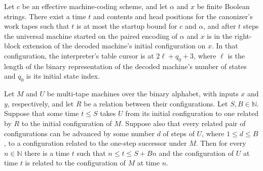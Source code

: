 \begin{lemma}
\label{Turing.universal_initialized}
\leanok
{}
Let $c$ be an effective machine-coding scheme, and let $\alpha$ and $x$ be finite
Boolean strings. There exist a time $t$ and contents and head positions for the
canonizer’s work tapes such that $t$ is at most the startup bound for $c$ and $\alpha$,
and after $t$ steps the universal machine started on the paired encoding of $\alpha$ and
$x$ is in the right-block extension of the decoded machine’s initial configuration on
$x$. In that configuration, the interpreter’s table cursor is at $2\ell+q_0+3$, where
$\ell$ is the length of the binary representation of the decoded machine’s number of
states and $q_0$ is its initial state index.
\end{lemma}

\begin{lemma}
\label{Turing.universal_block_run}
\leanok
{}
Let $M$ and $U$ be multi-tape machines over the binary alphabet, with inputs $x$ and
$y$, respectively, and let $R$ be a relation between their configurations. Let
$S,B\in\mathbb{N}$. Suppose that some time $t\le S$ takes $U$ from its initial
configuration to one related by $R$ to the initial configuration of $M$. Suppose also
that every related pair of configurations can be advanced by some number $d$ of steps of
$U$, where $1\le d\le B$, to a configuration related to the one-step successor under
$M$. Then for every $n\in\mathbb{N}$ there is a time $t$ such that $n\le t\le S+Bn$ and
the configuration of $U$ at time $t$ is related to the configuration of $M$ at time $n$.
\end{lemma}

